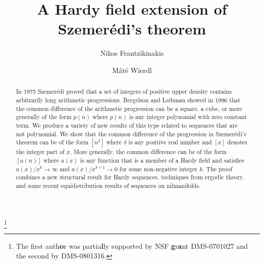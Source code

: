 \documentclass[11pt]{amsart}
\theoremstyle{plain}
\theoremstyle{definition}
\theoremstyle{remark}
\begin{document}
\title{A Hardy field extension of Szemer\'edi's theorem} \author{Nikos
  Frantzikinakis}
\address[Nikos  Frantzikinakis]{Department of Mathematics\\
  University of Memphis\\
  Memphis, TN \\ 38152 \\ USA } 

\author{M\'at\'e Wierdl}
\address[M\'at\'e Wierdl]{Department of Mathematics\\
  University of Memphis\\
  Memphis, TN \\ 38152 \\ USA } 


\begin{abstract}
  In 1975 Szemer\'edi proved that a set of integers of positive upper
  density contains arbitrarily long arithmetic progressions. Bergelson
  and Leibman showed in 1996 that the common difference of the
  arithmetic progression can be a square, a cube, or more generally of
  the form $p(n)$ where $p(n)$ is any integer polynomial with zero
  constant term.  We produce a variety of new results of this type
  related to sequences that are not polynomial. We show that the
  common difference of the progression in Szemer\'edi's theorem can be of the form
  $[n^\delta]$ where $\delta$ is
  any positive real number and $[x]$ denotes the integer part of $x$.
  More generally, the common difference can be of the form $[a(n)]$
  where $a(x)$ is any function that is a member of a Hardy field and satisfies
  $a(x)/x^k\to \infty$ and $a(x)/x^{k+1}\to 0$ for some non-negative
  integer $k$.
  The proof combines a new structural result for Hardy sequences,
  techniques from ergodic theory, and some recent equidistribution
  results of sequences on nilmanifolds.
\end{abstract}

\thanks{The first  auth\textbf{o}r was partia\textbf{l}ly supported by NSF \textbf{g}r\textbf{a}nt
  DMS-0701027 and the second by   DMS-0801316.}

\end{document}

